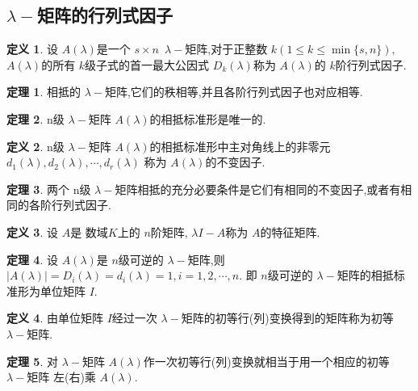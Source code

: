 \documentclass[a4paper,11pt]{article}%
\theoremstyle{remark}
\theoremstyle{definition}
\newtheorem{theorem}{定理}[section]
\theoremstyle{definition}
\newtheorem*{definition}{定义}
\theoremstyle{plain}
\newcommand*{\abs}[1]{\lvert #1 \rvert}
\begin{document}
\subsection{$\lambda-$矩阵的行列式因子}
\begin{definition}
    设 $A(\lambda)$是一个 $s\times n\phantom{1}\lambda-$矩阵,对于正整数 $k(1\leq k\leq\min\{s,n\}),$
    $A(\lambda)$的所有 $k$级子式的首一最大公因式 $D_k(\lambda)$称为 $A(\lambda)$的 $k$阶行列式因子.
\end{definition}
\begin{theorem}
    相抵的 $\lambda-$矩阵,它们的秩相等,并且各阶行列式因子也对应相等. 
\end{theorem}
\begin{theorem}
    n级 $\lambda-$矩阵 $A(\lambda)$的相抵标准形是唯一的.
\end{theorem}
\begin{definition}
    n级 $\lambda-$矩阵 $A(\lambda)$的相抵标准形中主对角线上的非零元 $d_1(\lambda),d_2(\lambda),\cdots,d_r(\lambda)$
    称为 $A(\lambda)$的不变因子.
\end{definition}
\begin{theorem}
    两个 n级 $\lambda-$矩阵相抵的充分必要条件是它们有相同的不变因子,或者有相同的各阶行列式因子.
\end{theorem}
\begin{definition}
    设 $A$是 数域$K$上的 $n$阶矩阵, $\lambda I-A$称为 $A$的特征矩阵.
\end{definition}
\begin{theorem}
    设 $A(\lambda)$是 $n$级可逆的 $\lambda-$矩阵,则 $\abs{A(\lambda)}=D_i(\lambda)=d_i(\lambda)=1,i=1,2,\cdots,n$.
    即 $n$级可逆的 $\lambda-$矩阵的相抵标准形为单位矩阵 $I$.
\end{theorem}
\begin{definition}
    由单位矩阵 $I$经过一次 $\lambda-$矩阵的初等行(列)变换得到的矩阵称为初等 $\lambda-$矩阵.
\end{definition}
\begin{theorem}
    对 $\lambda-$矩阵 $A(\lambda)$作一次初等行(列)变换就相当于用一个相应的初等 $\lambda-$矩阵
    左(右)乘 $A(\lambda)$.
\end{theorem}
\end{document}
